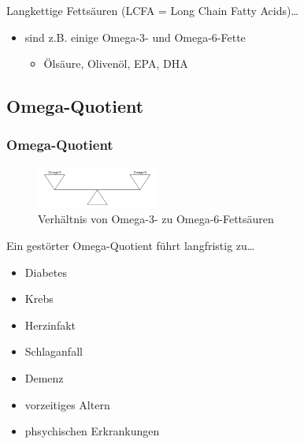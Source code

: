 \documentclass[xcolor=dvipsnames]{beamer}
\begin{document}
\begin{frame}[allowframebreaks]
        \framebreak

        \begin{block}{Langkettige Fettsäuren (LCFA = Long Chain Fatty Acids)\ldots}
            \begin{itemize}
                \setlength\itemsep{1em}
                \item sind z.B. einige Omega-3- und Omega-6-Fette
                \begin{itemize}
                    \item Ölsäure, Olivenöl, EPA, DHA
                \end{itemize}
            \end{itemize}
        \end{block}

    \end{frame}

    \subsection{Omega-Quotient}
    \begin{frame}[allowframebreaks]
        \frametitle{Omega-Quotient}

        \begin{figure}
            \centering
            \includegraphics[width=4cm]{../images/omega-waage.png}
            \caption{Verhältnis von Omega-3- zu Omega-6-Fettsäuren}
        \end{figure}

        \framebreak

        \begin{block}{Ein gestörter Omega-Quotient führt langfristig zu\ldots}
            \begin{itemize}
                \setlength\itemsep{1em}
                \item Diabetes
                \item Krebs
                \item Herzinfakt
                \item Schlaganfall
                \item Demenz
                \item vorzeitiges Altern
                \item phsychischen Erkrankungen
            \end{itemize}
        \end{block}
    \end{frame}
\end{document}
